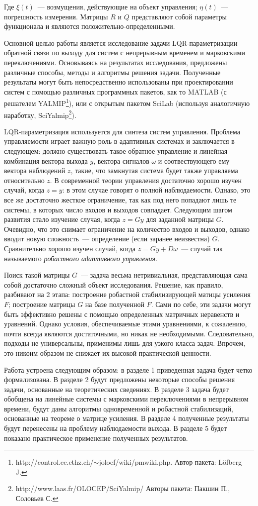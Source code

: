 Где $\xi(t)$~--- возмущения, действующие на объект управления; $\eta(t)$~--- погрешность измерения. Матрицы $R$ и $Q$ представляют собой параметры функционала и являются положительно-определенными.\br

Основной целью работы является исследование задачи LQR-парамет\-ризации обратной связи по выходу для систем с непрерывным временем и марковскими переключениями. Основываясь на результатах исследования, предложены различные способы, методы и алгоритмы решения задачи. Полученные результаты могут быть непосредственно использованы при проектировании систем с помощью различных программных пакетов, как то MATLAB (с решателем YALMIP\footnote{ {\selectfont http://control.ee.ethz.ch/$\sim$joloef/wiki/pmwiki.php}. Автор пакета: Löfberg J. }), или с открытым пакетом SciLab (используя аналогичную наработку, SciYalmip\footnote{{\selectfont http://www.laas.fr/OLOCEP/SciYalmip/} Авторы пакета: Пакшин П., Соловьев С.}).\br

LQR-параметризация используется для синтеза систем управления. Проблема управляемости играет важную роль в адаптивных системах и заключается в следующем: должно существовать такое обратное управление и линейная комбинация вектора выхода $y$, вектора сигналов $\omega$ и соотвествующего ему вектора наблюдений $z$, такие, что замкнутая система будет также управляема относительно $z$. В современной теории управления достаточно хорошо изучен случай, когда $z=y$: в этом случае говорят о полной наблюдаемости. Однако, это все же достаточно жесткое ограничение, так как под него попадают лишь те системы, в которых число входов и выходов совпадает. Следующим шагом развития стало изучение случая, когда $z=Gy$ для заданной матрицы $G$. Очевидно, что это снимает ограничение на количество входов и выходов, однако вводит новую сложность~--- определение (если заранее неизвестна) $G$. Сравнительно хорошо изучен случай, когда $z=Gy+D\omega$~--- случай так называемого \emph{робастного адаптивного управления}.

Поиск такой матрицы $G$~--- задача весьма нетривиальная, представляющая сама собой достаточно сложный объект исследования. Решение, как правило, разбивают на 2 этапа: построение робастной стабилизирующей матицы усиления $F$; построение матрицы $G$ на базе полученной $F$. Сами по себе, эти задачи могут быть эффективно решены с помощью определенных матричных неравенств и уравнений. Однако условия, обеспечиваемые этими уравнениями, к сожалению, почти всегда являются достаточными, но никак не необходимыми. Следовательно, подходы не универсальны, применимы лишь для узкого класса задач. Впрочем, это никоим образом не снижает их высокой практической ценности.\br

Работа устроена следующим образом: в разделе 1 приведенная задача будет четко формализована. В разделе 2 будут предложены некоторые способы решения задачи, основанные на теоретических сведениях. В разделе 3 задача будет обобщена на линейные системы с марковскими переключениями в непрерывном времени, будут даны алгоритмы одновременной и робастной стабилизаций, основанные на теореме о матрице усиления. В разделе 4 полученные результаты будут перенесены на проблему наблюдаемости выхода. В разделе 5 будет показано практическое применение полученных результатов.
